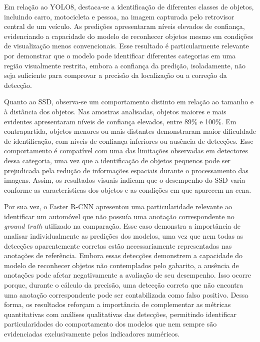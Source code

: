Em relação ao YOLO8, destaca-se a identificação de diferentes classes de objetos, incluindo
carro, motocicleta e pessoa, na imagem capturada pelo retrovisor central de um veículo. As
predições apresentaram níveis elevados de confiança, evidenciando a capacidade do modelo de
reconhecer objetos mesmo em condições de visualização menos convencionais. Esse resultado é
particularmente relevante por demonstrar que o modelo pode identificar diferentes categorias
em uma região visualmente restrita, embora a confiança da predição, isoladamente, não seja
suficiente para comprovar a precisão da localização ou a correção da detecção.

Quanto ao SSD, observa-se um comportamento distinto em relação ao tamanho e à distância dos
objetos. Nas amostras analisadas, objetos maiores e mais evidentes apresentaram níveis de
confiança elevados, entre 89\% e 100\%. Em contrapartida, objetos menores ou mais distantes
demonstraram maior dificuldade de identificação, com níveis de confiança inferiores ou
ausência de detecções. Esse comportamento é compatível com uma das limitações observadas em
detectores dessa categoria, uma vez que a identificação de objetos pequenos pode ser
prejudicada pela redução de informações espaciais durante o processamento das imagens. Assim,
os resultados visuais indicam que o desempenho do SSD varia conforme as características dos
objetos e as condições em que aparecem na cena.

Por sua vez, o Faster R-CNN apresentou uma particularidade relevante ao identificar um
automóvel que não possuía uma anotação correspondente no \textit{ground truth} utilizado na
comparação. Esse caso demonstra a importância de analisar individualmente as predições dos
modelos, uma vez que nem todas as detecções aparentemente corretas estão necessariamente
representadas nas anotações de referência. Embora essas detecções demonstrem a capacidade do
modelo de reconhecer objetos não contemplados pelo gabarito, a ausência de anotações pode
afetar negativamente a avaliação de seu desempenho. Isso ocorre porque, durante o cálculo da
precisão, uma detecção correta que não encontra uma anotação correspondente pode ser
contabilizada como falso positivo. Dessa forma, os resultados reforçam a importância de
complementar as métricas quantitativas com análises qualitativas das detecções, permitindo
identificar particularidades do comportamento dos modelos que nem sempre são evidenciadas
exclusivamente pelos indicadores numéricos.